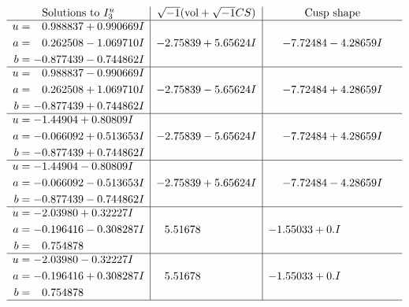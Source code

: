 \documentclass[1p]{elsarticle_modified}
\theoremstyle{definition}
\newcommand{\I}{\sqrt{-1}}
\begin{document}
$$\begin{array}{c|c|c}  
\text{Solutions to }I^u_{3}& \I (\text{vol} + \sqrt{-1}CS) & \text{Cusp shape}\\
 \hline 
\begin{aligned}
u &= \phantom{-}0.988837 + 0.990669 I \\
a &= \phantom{-}0.262508 - 1.069710 I \\
b &= -0.877439 - 0.744862 I\end{aligned}
 & -2.75839 + 5.65624 I & -7.72484 - 4.28659 I \\ \hline\begin{aligned}
u &= \phantom{-}0.988837 - 0.990669 I \\
a &= \phantom{-}0.262508 + 1.069710 I \\
b &= -0.877439 + 0.744862 I\end{aligned}
 & -2.75839 - 5.65624 I & -7.72484 + 4.28659 I \\ \hline\begin{aligned}
u &= -1.44904 + 0.80809 I \\
a &= -0.066092 + 0.513653 I \\
b &= -0.877439 + 0.744862 I\end{aligned}
 & -2.75839 - 5.65624 I & -7.72484 + 4.28659 I \\ \hline\begin{aligned}
u &= -1.44904 - 0.80809 I \\
a &= -0.066092 - 0.513653 I \\
b &= -0.877439 - 0.744862 I\end{aligned}
 & -2.75839 + 5.65624 I & -7.72484 - 4.28659 I \\ \hline\begin{aligned}
u &= -2.03980 + 0.32227 I \\
a &= -0.196416 - 0.308287 I \\
b &= \phantom{-}0.754878\phantom{ +0.000000I}\end{aligned}
 & \phantom{-}5.51678\phantom{ +0.000000I} & -1.55033 + 0. I\phantom{ +0.000000I} \\ \hline\begin{aligned}
u &= -2.03980 - 0.32227 I \\
a &= -0.196416 + 0.308287 I \\
b &= \phantom{-}0.754878\phantom{ +0.000000I}\end{aligned}
 & \phantom{-}5.51678\phantom{ +0.000000I} & -1.55033 + 0. I\phantom{ +0.000000I}\\
 \hline 
 \end{array}$$\newpage\newpage\renewcommand{\arraystretch}{1}
\end{document}
